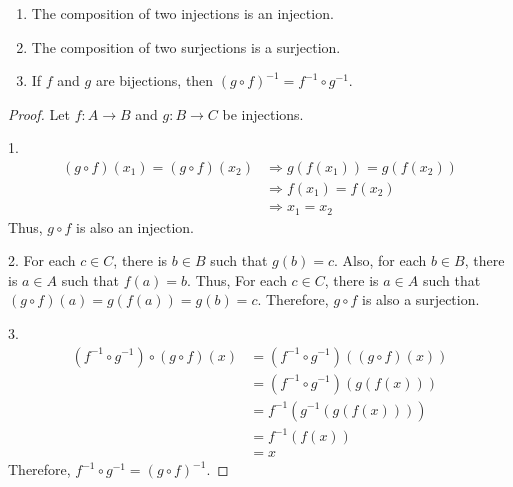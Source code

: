 \documentclass[../main.tex]{subfiles}
\begin{document}
\begin{prop}
    \begin{enumerate}
        \item The composition of two injections is an injection.
        \item The composition of two surjections is a surjection.
        \item If $f$ and $g$ are bijections, then $(g \circ f)^{-1} = f^{-1} \circ g^{-1}$.
    \end{enumerate}
\end{prop}
\begin{proof}
    Let $f: A \rightarrow B$ and $g: B \rightarrow C$ be injections.

    1.
    \begin{align*}
        (g \circ f)(x_1) = (g \circ f)(x_2) &\Rightarrow g(f(x_1)) = g(f(x_2))\\
                                            &\Rightarrow f(x_1) = f(x_2)\\
                                            &\Rightarrow x_1 = x_2
    \end{align*}
    Thus, $g \circ f$ is also an injection.

    2. For each $c \in C$, there is $b \in B$ such that $g(b) = c$.
    Also, for each $b \in B$, there is $a \in A$ such that $f(a) = b$.
    Thus, For each $c \in C$, there is $a \in A$ such that $(g \circ f)(a) = g(f(a)) = g(b) = c$.
    Therefore, $g \circ f$ is also a surjection.

    3.
    \begin{align*}
        \left(f^{-1} \circ g^{-1}\right) \circ (g \circ f)(x) &= \left(f^{-1} \circ g^{-1}\right) \left((g \circ f)(x)\right)\\
                                                              &= \left(f^{-1} \circ g^{-1}\right) \left(g(f(x))\right)\\
                                                              &= f^{-1} \left(g^{-1}(g(f(x)))\right)\\
                                                              &= f^{-1} (f(x))\\
                                                              &= x
    \end{align*}
    Therefore, $f^{-1} \circ g^{-1} = (g \circ f)^{-1}$.
\end{proof}
\end{document}
